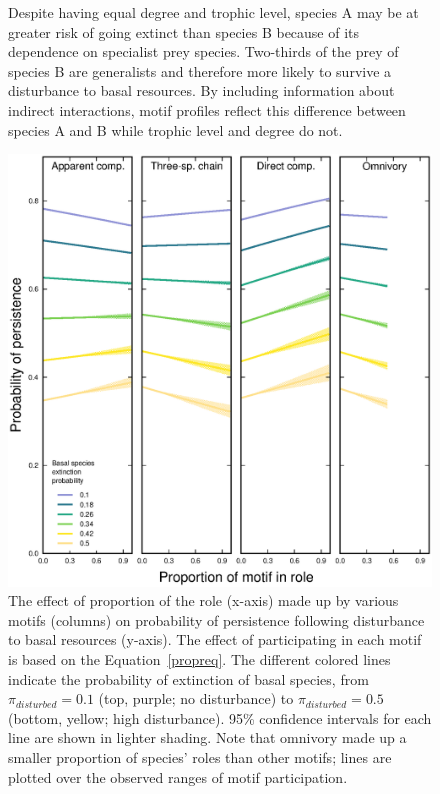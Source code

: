 \documentclass[12pt]{article}
\begin{document}
\begin{spacing}{2.0}
\begin{figure}[hb!]
{        Despite having equal degree and trophic level, species A may be at greater risk of going extinct than species B because of its dependence on specialist prey species. Two-thirds of the prey of species B are generalists and therefore more likely to survive a disturbance to basal resources. By including information about indirect interactions, motif profiles reflect this difference between species A and B while trophic level and degree do not.}
    \label{fig:concept}
    \end{figure}



    
        \begin{figure}[hb!]
        \centering
        \includegraphics[width=\textwidth]{figures/persistence_motif_participation.eps}
        \caption{The effect of proportion of the role (x-axis) made up by various motifs (columns) on probability of persistence following disturbance to basal resources (y-axis). The effect of participating in each motif is based on the Equation~\ref{propreq}. The different colored lines indicate the probability of extinction of basal species, from $\pi_{disturbed} = 0.1$ (top, purple; no disturbance) to $\pi_{disturbed} = 0.5$ (bottom, yellow; high disturbance). 95\% confidence intervals for each line are shown in lighter shading. Note that omnivory made up a smaller proportion of species' roles than other motifs; lines are plotted over the observed ranges of motif participation.}
    \label{fig:prop_lmer_all}
    \end{figure}
        

\end{spacing}
\end{document}
